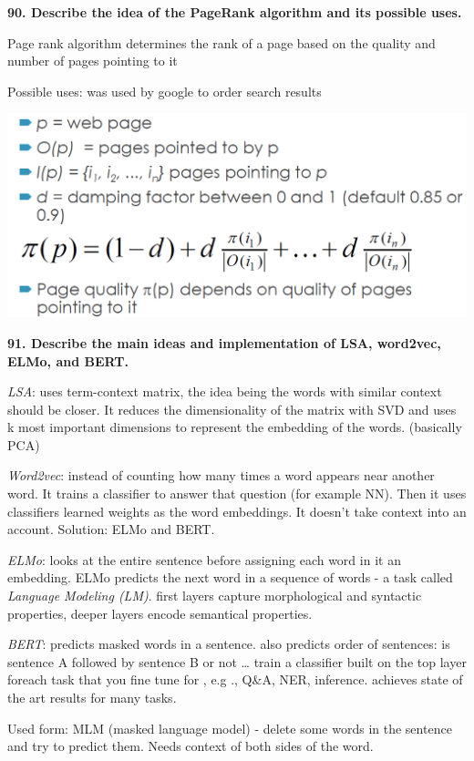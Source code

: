 \textbf{90. Describe the idea of the PageRank algorithm and its possible
uses.}

Page rank algorithm determines the rank of a page based on the quality
and number of pages pointing to it

Possible uses: was used by google to order search results

\includegraphics[width=\columnwidth]{media/image2.png}

\textbf{91. Describe the main ideas and implementation of LSA, word2vec,
ELMo, and BERT.}

\textit{LSA}: uses term-context matrix, the idea being the words with
similar context should be closer. It reduces the dimensionality of the
matrix with SVD and uses k most important dimensions to represent the
embedding of the words. (basically PCA)

\textit{Word2vec}: instead of counting how many times a word appears
near another word. It trains a classifier to answer that question (for
example NN). Then it uses classifiers learned weights as the word
embeddings. It doesn't take context into an account. Solution: ELMo and
BERT.

\textit{ELMo}: looks at the entire sentence before assigning each
word in it an embedding. ELMo predicts the next word in a sequence of
words - a task called \emph{Language Modeling (LM)}. first layers
capture morphological and syntactic properties, deeper layers encode
semantical properties.

\textit{BERT}: predicts masked words in a sentence. also predicts
order of sentences: is sentence A followed by sentence B or not \ldots{}
train a classifier built on the top layer foreach task that you fine
tune for , e.g ., Q\&A, NER, inference. achieves state of the art
results for many tasks.

Used form: MLM (masked language model) - delete some words in the
sentence and try to predict them. Needs context of both sides of the
word.

